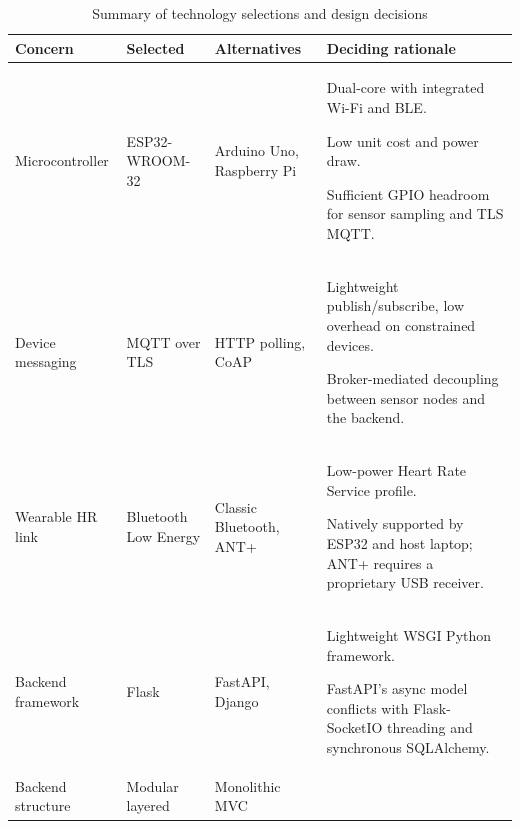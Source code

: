 \begin{table}[p]
\centering
\caption[Technology selections and design decisions]{Summary of technology selections and design decisions}
\label{tab:tech_decisions}
\footnotesize
\renewcommand{\arraystretch}{1.05}
\setlength{\tabcolsep}{4pt}
\begin{tabularx}{\textwidth}{@{} >{\raggedright\arraybackslash}p{2.5cm} >{\raggedright\arraybackslash}p{3.0cm} >{\raggedright\arraybackslash}p{2.6cm} >{\raggedright\arraybackslash}X @{}}
\toprule
\textbf{Concern} & \textbf{Selected} & \textbf{Alternatives} & \textbf{Deciding rationale} \\
\midrule
Microcontroller & ESP32-WROOM-32 & Arduino Uno, Raspberry Pi &
  \begin{tblitem}
    \item Dual-core with integrated Wi-Fi and BLE.
    \item Low unit cost and power draw.
    \item Sufficient GPIO headroom for sensor sampling and TLS MQTT.
  \end{tblitem} \\
\addlinespace[4pt]
Device messaging & MQTT over TLS & HTTP polling, CoAP &
  \begin{tblitem}
    \item Lightweight publish/subscribe, low overhead on constrained devices.
    \item Broker-mediated decoupling between sensor nodes and the backend.
  \end{tblitem} \\
\addlinespace[4pt]
Wearable HR link & Bluetooth Low Energy & Classic Bluetooth, ANT+ &
  \begin{tblitem}
    \item Low-power Heart Rate Service profile.
    \item Natively supported by ESP32 and host laptop; ANT+ requires a proprietary USB receiver.
  \end{tblitem} \\
\addlinespace[4pt]
Backend framework & Flask & FastAPI, Django &
  \begin{tblitem}
    \item Lightweight WSGI Python framework.
    \item FastAPI's async model conflicts with Flask-SocketIO threading and synchronous SQLAlchemy.
  \end{tblitem} \\
\addlinespace[4pt]
Backend structure & Modular layered & Monolithic MVC &

\end{tabularx}
\end{table}
